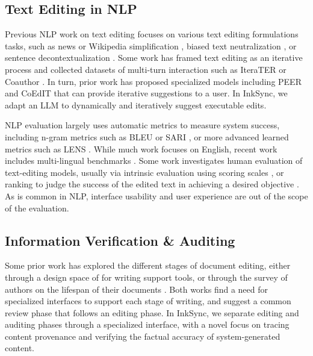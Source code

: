 \documentclass[manuscript]{acmart}
\begin{document}
\subsection{Text Editing in NLP} \label{sec:rel_work_nlp}

Previous NLP work on text editing focuses on various text editing formulations tasks, such as news or Wikipedia simplification \cite{xu2015problems,laban2023swipe}, biased text neutralization \cite{pryzant2020automatically}, or sentence decontextualization \cite{choi2021decontextualization}. Some work has framed text editing as an iterative process \cite{du2022read} and collected datasets of multi-turn interaction such as IteraTER \cite{du2022understanding} or Coauthor \cite{lee2022coauthor}. In turn, prior work has proposed specialized models including PEER \cite{schick2022peer} and CoEdIT \cite{raheja2023coedit} that can provide iterative suggestions to a user. In InkSync, we adapt an LLM to dynamically and iteratively suggest executable edits.

NLP evaluation largely uses automatic metrics to measure system success, including n-gram metrics such as BLEU \cite{papineni2002bleu} or SARI \cite{xu2016optimizing}, or more advanced learned metrics such as LENS \cite{maddela2022lens}. While much work focuses on English, recent work includes multi-lingual benchmarks \cite{ryan2023revisiting}. Some work investigates human evaluation of text-editing models, usually via intrinsic evaluation using scoring scales \cite{alva2021suitability}, or ranking \cite{maddela2022lens} to judge the success of the edited text in achieving a desired objective \cite{laban2021keep}. As is common in NLP, interface usability and user experience are out of the scope of the evaluation.

\subsection{Information Verification \& Auditing}

Some prior work has explored the different stages of document editing, either through a design space of \cite{gero2022design} for writing support tools, or through the survey of authors on the lifespan of their documents \cite{sarrafzadeh2021characterizing}. Both works find a need for specialized interfaces to support each stage of writing, and suggest a common review phase that follows an editing phase. In InkSync, we separate editing and auditing phases through a specialized interface, with a novel focus on tracing content provenance and verifying the factual accuracy of system-generated content.
\end{document}
